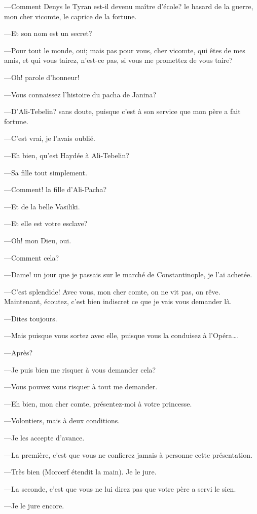 —Comment Denys le Tyran est-il devenu maître d'école? le hasard de la guerre, mon cher vicomte, le caprice de la fortune. 

—Et son nom est un secret? 

—Pour tout le monde, oui; mais pas pour vous, cher vicomte, qui êtes de mes amis, et qui vous tairez, n'est-ce pas, si vous me promettez de vous taire? 

—Oh! parole d'honneur! 

—Vous connaissez l'histoire du pacha de Janina? 

—D'Ali-Tebelin? sans doute, puisque c'est à son service que mon père a fait fortune. 

—C'est vrai, je l'avais oublié. 

—Eh bien, qu'est Haydée à Ali-Tebelin? 

—Sa fille tout simplement. 

—Comment! la fille d'Ali-Pacha?  

—Et de la belle Vasiliki. 

—Et elle est votre esclave? 

—Oh! mon Dieu, oui. 

—Comment cela? 

—Dame! un jour que je passais sur le marché de Constantinople, je l'ai achetée. 

—C'est splendide! Avec vous, mon cher comte, on ne vit pas, on rêve. Maintenant, écoutez, c'est bien indiscret ce que je vais vous demander là. 

—Dites toujours. 

—Mais puisque vous sortez avec elle, puisque vous la conduisez à l'Opéra\dots. 

—Après? 

—Je puis bien me risquer à vous demander cela? 

—Vous pouvez vous risquer à tout me demander. 

—Eh bien, mon cher comte, présentez-moi à votre princesse. 

—Volontiers, mais à deux conditions. 

—Je les accepte d'avance.  

—La première, c'est que vous ne confierez jamais à personne cette présentation. 

—Très bien (Morcerf étendit la main). Je le jure. 

—La seconde, c'est que vous ne lui direz pas que votre père a servi le sien. 

—Je le jure encore. 

